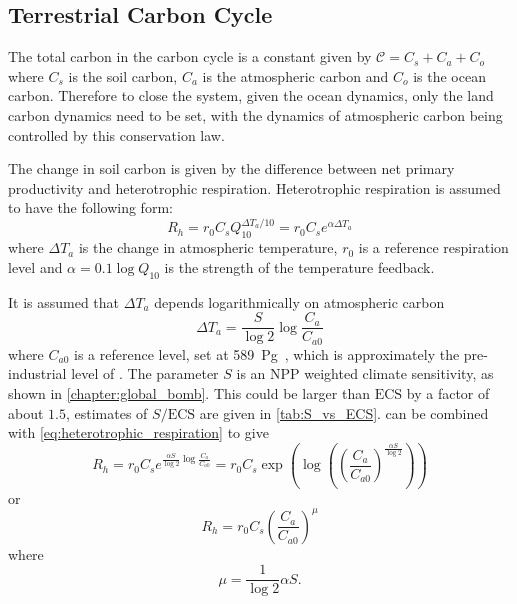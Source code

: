 \subsection{Terrestrial Carbon Cycle}
The total carbon in the carbon cycle is a constant given by $\mathcal{C}  = C_s + C_a + C_o$ where $C_s$ is the soil carbon, $C_a$ is the atmospheric carbon  and $C_o$ is the ocean carbon.
Therefore to close the system, given the ocean dynamics, only the land carbon dynamics need to be set, with the dynamics of atmospheric carbon being controlled by this conservation law.

The change in soil carbon is given by the difference between net primary productivity and heterotrophic respiration. Heterotrophic
respiration is assumed to have the following form:
\begin{equation}
  \label{eq:heterotrophic_respiration}
  R_h = r_0 C_s Q_{10}^{\Delta T_a/10} = r_0 C_s e^{\alpha \Delta T_a}
\end{equation}
where $\Delta T_a$ is the change in atmospheric temperature, $r_0$ is a reference respiration level and $\alpha = 0.1\log Q_{10}$ is the strength of the temperature feedback.

It is assumed that $\Delta T_a$ depends logarithmically on atmospheric carbon
\begin{equation}
  \label{eq:air_temperature}
  \Delta T_a = \frac{S}{\log 2} \log \frac{C_a}{C_{a0}}
\end{equation}
where $C_{a0}$ is a reference  level, set at \SI{589}{\peta\gram\carbon}, which is approximately the pre-industrial
level of  \parencite{Lade2018}. The parameter $S$ is an NPP weighted climate sensitivity, as shown in
\cref{chapter:global_bomb}. This could be larger than $\mathrm{ECS}$ by a factor of about $1.5$, estimates of $S/\mathrm{ECS}$ are given
in \cref{tab:S_vs_ECS}.  can be combined with \cref{eq:heterotrophic_respiration} to give
\begin{equation}
  R_h = r_0 C_s e^{\frac{\alpha S}{\log 2} \log \frac{C_a}{C_{a0}}} = r_0 C_s \exp\left(\log \left( \left(\frac{C_a}{C_{a0}}\right)^{\frac{\alpha S}{\log 2}}\right)\right)
\end{equation}
or
\begin{equation}
  \label{eq:heterotrophic_respiration_combined}
  R_h = r_0 C_s \left( \frac{C_a}{C_{a0}}\right)^{\mu}
\end{equation}
where
\begin{equation}
  \label{eq:mu}
  \mu = \frac{1}{\log 2} \alpha S.
\end{equation}

